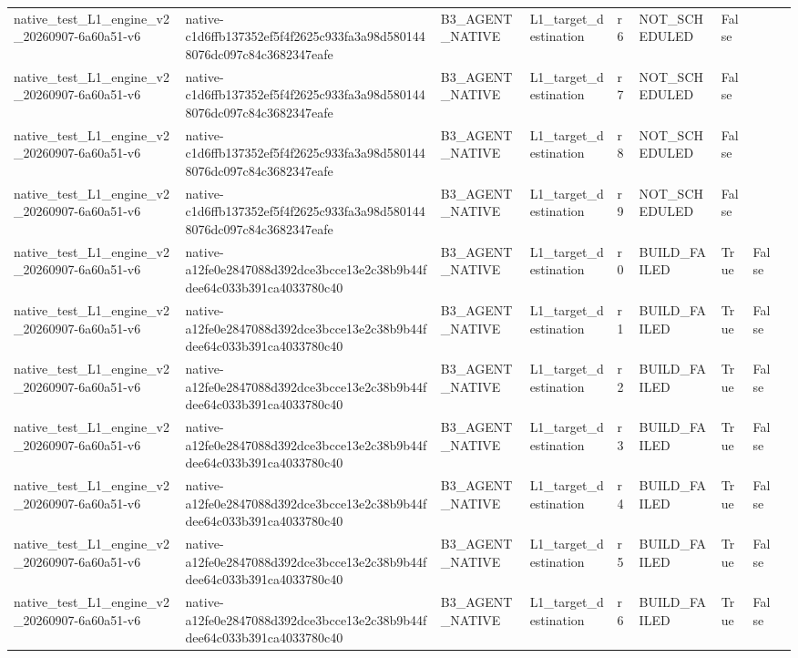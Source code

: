 \begin{tabular}{lllllllll}
native\_test\_L1\_engine\_v2\_20260907-6a60a51-v6 & native-c1d6ffb137352ef5f4f2625c933fa3a98d5801448076dc097c84c3682347eafe & B3\_AGENT\_NATIVE & L1\_target\_destination & r6 & NOT\_SCHEDULED & False &  &  \\
native\_test\_L1\_engine\_v2\_20260907-6a60a51-v6 & native-c1d6ffb137352ef5f4f2625c933fa3a98d5801448076dc097c84c3682347eafe & B3\_AGENT\_NATIVE & L1\_target\_destination & r7 & NOT\_SCHEDULED & False &  &  \\
native\_test\_L1\_engine\_v2\_20260907-6a60a51-v6 & native-c1d6ffb137352ef5f4f2625c933fa3a98d5801448076dc097c84c3682347eafe & B3\_AGENT\_NATIVE & L1\_target\_destination & r8 & NOT\_SCHEDULED & False &  &  \\
native\_test\_L1\_engine\_v2\_20260907-6a60a51-v6 & native-c1d6ffb137352ef5f4f2625c933fa3a98d5801448076dc097c84c3682347eafe & B3\_AGENT\_NATIVE & L1\_target\_destination & r9 & NOT\_SCHEDULED & False &  &  \\
native\_test\_L1\_engine\_v2\_20260907-6a60a51-v6 & native-a12fe0e2847088d392dce3bcce13e2c38b9b44fdee64c033b391ca4033780c40 & B3\_AGENT\_NATIVE & L1\_target\_destination & r0 & BUILD\_FAILED & True & False &  \\
native\_test\_L1\_engine\_v2\_20260907-6a60a51-v6 & native-a12fe0e2847088d392dce3bcce13e2c38b9b44fdee64c033b391ca4033780c40 & B3\_AGENT\_NATIVE & L1\_target\_destination & r1 & BUILD\_FAILED & True & False &  \\
native\_test\_L1\_engine\_v2\_20260907-6a60a51-v6 & native-a12fe0e2847088d392dce3bcce13e2c38b9b44fdee64c033b391ca4033780c40 & B3\_AGENT\_NATIVE & L1\_target\_destination & r2 & BUILD\_FAILED & True & False &  \\
native\_test\_L1\_engine\_v2\_20260907-6a60a51-v6 & native-a12fe0e2847088d392dce3bcce13e2c38b9b44fdee64c033b391ca4033780c40 & B3\_AGENT\_NATIVE & L1\_target\_destination & r3 & BUILD\_FAILED & True & False &  \\
native\_test\_L1\_engine\_v2\_20260907-6a60a51-v6 & native-a12fe0e2847088d392dce3bcce13e2c38b9b44fdee64c033b391ca4033780c40 & B3\_AGENT\_NATIVE & L1\_target\_destination & r4 & BUILD\_FAILED & True & False &  \\
native\_test\_L1\_engine\_v2\_20260907-6a60a51-v6 & native-a12fe0e2847088d392dce3bcce13e2c38b9b44fdee64c033b391ca4033780c40 & B3\_AGENT\_NATIVE & L1\_target\_destination & r5 & BUILD\_FAILED & True & False &  \\
native\_test\_L1\_engine\_v2\_20260907-6a60a51-v6 & native-a12fe0e2847088d392dce3bcce13e2c38b9b44fdee64c033b391ca4033780c40 & B3\_AGENT\_NATIVE & L1\_target\_destination & r6 & BUILD\_FAILED & True & False &  \\

\end{tabular}
